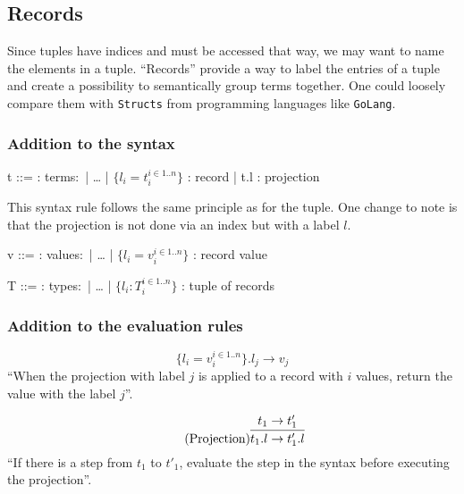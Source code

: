 \subsection{Records}

Since tuples have indices and must be accessed that way, we may want to
name the elements in a tuple. ``Records'' provide a way to label the entries
of a tuple and create a possibility to semantically group terms together.
One could loosely compare them with \texttt{Structs} from programming
languages like \texttt{GoLang}.

\subsubsection{Addition to the syntax \cite{pierce2002ProgLang}}
\begin{bnfgrammar}
    t ::= : terms$\colon$
    | \dots
    | $\{l_i = t_i^{i \in 1..n}\}$ : record
    | t.l : projection
\end{bnfgrammar}\leavevmode\newline
This syntax rule follows the same principle as for the tuple. One change to
note is that the projection is not done via an index but with a label $l$.

\begin{bnfgrammar}
    v ::= : values$\colon$
    | \dots
    | $\{l_i = v_i^{i \in 1..n}\}$ : record value
\end{bnfgrammar}\leavevmode\newline

\begin{bnfgrammar}
    T ::= : types$\colon$
    | \dots
    | $\{l_i \colon T_i^{i \in 1..n}\}$ : tuple of records
\end{bnfgrammar}\leavevmode\newline

\subsubsection{Addition to the evaluation rules \cite{pierce2002ProgLang}}
\begin{equation*}
    \tag{Record projection}
    \{l_i = v_i^{i \in 1..n}\} . l_j \rightarrow v_j
\end{equation*}
``When the projection with label $j$ is applied to a record with
$i$ values, return the value with the label $j$''.

\begin{equation*}
    \tag{Projection}
    \infer{
        t_1 . l \rightarrow t'_1 . l
    }{
        t_1 \rightarrow t'_1
    }
\end{equation*}
``If there is a step from $t_1$ to $t'_1$, evaluate the step
in the syntax before executing the projection''.

